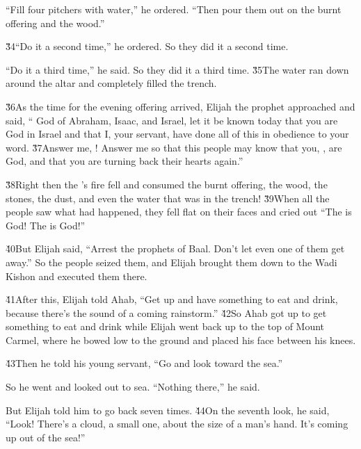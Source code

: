 ``Fill four pitchers with water,'' he ordered. ``Then pour them out on the burnt offering and the wood.''

\v{34}``Do it a second time,'' he ordered. So they did it a second time.

``Do it a third time,'' he said. So they did it a third time. \v{35}The water ran down around the altar and completely filled the trench.

\v{36}As the time for the evening offering arrived, Elijah the prophet approached and said, `` God of Abraham, Isaac, and Israel, let it be known today that you are God in Israel and that I, your servant, have done all of this in obedience to your word. \v{37}Answer me, ! Answer me so that this people may know that you, , are God, and that you are turning back their hearts again.''

\v{38}Right then the 's fire fell and consumed the burnt offering, the wood, the stones, the dust, and even the water that was in the trench! \v{39}When all the people saw what had happened, they fell flat on their faces and cried out ``The  is God! The  is God!''

\v{40}But Elijah said, ``Arrest the prophets of Baal. Don't let even one of them get away.'' So the people seized them, and Elijah brought them down to the Wadi Kishon and executed them there.

\v{41}After this, Elijah told Ahab, ``Get up and have something to eat and drink, because there's the sound of a coming rainstorm.'' \v{42}So Ahab got up to get something to eat and drink while Elijah went back up to the top of Mount Carmel, where he bowed low to the ground and placed his face between his knees.

\v{43}Then he told his young servant, ``Go and look toward the sea.''

So he went and looked out to sea. ``Nothing there,'' he said.

But Elijah told him to go back seven times. \v{44}On the seventh look, he said, ``Look! There's a cloud, a small one, about the size of a man's hand. It's coming up out of the sea!''

